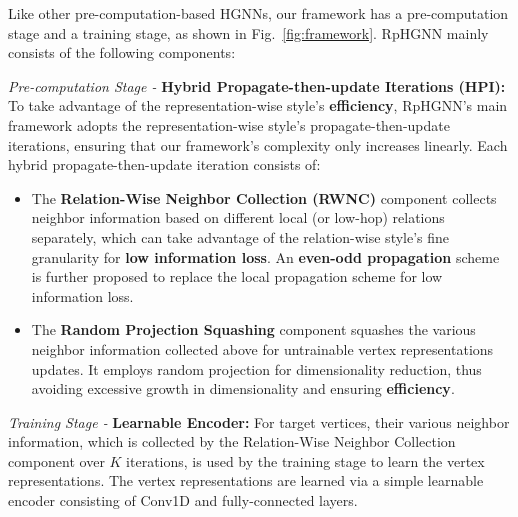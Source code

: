 \documentclass[lettersize,journal]{IEEEtran}
\begin{document}
Like other pre-computation-based HGNNs, our framework has a pre-computation stage and a training stage, as shown in Fig.~\ref{fig:framework}.
RpHGNN mainly consists of the following components:


\textit{Pre-computation Stage -} \textbf{Hybrid Propagate-then-update Iterations (HPI):}
To take advantage of the representation-wise style's \textbf{efficiency}, RpHGNN's main framework adopts the representation-wise style's propagate-then-update iterations, ensuring that our framework's complexity only increases linearly.
Each hybrid propagate-then-update iteration consists of:
\begin{itemize}
\item The \textbf{Relation-Wise Neighbor Collection (RWNC)} component collects neighbor information based on different local (or low-hop) relations separately, which can take advantage of the relation-wise style's fine granularity for \textbf{low information loss}.
An \textbf{even-odd propagation} scheme is further proposed to replace the local propagation scheme for low information loss.
\item The \textbf{Random Projection Squashing} component squashes the various neighbor information collected above for untrainable vertex representations updates.
It employs random projection for dimensionality reduction, thus avoiding excessive growth in dimensionality and ensuring \textbf{efficiency}.
\end{itemize}

\textit{Training Stage -} \textbf{Learnable Encoder:}
For target vertices, their various neighbor information, which is collected by the Relation-Wise Neighbor Collection component over $K$ iterations, is used by the training stage to learn the vertex representations.
The vertex representations are learned via a simple learnable encoder consisting of Conv1D and fully-connected layers.
\end{document}
